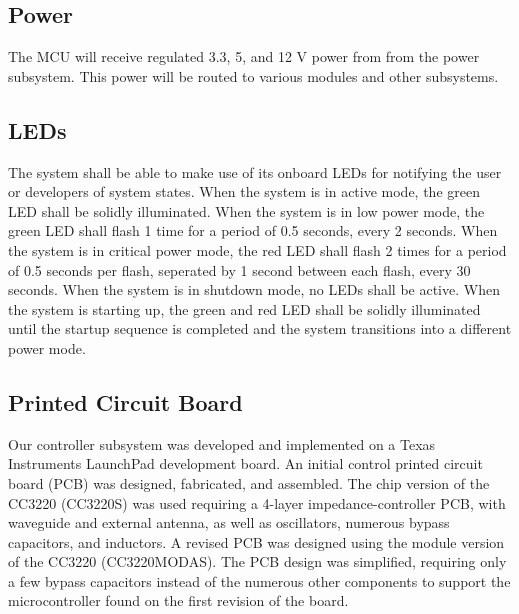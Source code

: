 \subsection{Power}
The MCU will receive regulated 3.3, 5, and 12 V power from from the power subsystem. This power will be routed to various modules and other subsystems.

\subsection{LEDs} The system shall be able to make use of its onboard LEDs for notifying the user or developers of system states. When the system is in active mode, the green LED shall be solidly illuminated. When the system is in low power mode, the green LED shall flash 1 time for a period of 0.5 seconds, every 2 seconds. When the system is in critical power mode, the red LED shall flash 2 times for a period of 0.5 seconds per flash, seperated by 1 second between each flash, every 30 seconds. When the system is in shutdown mode, no LEDs shall be active. When the system is starting up, the green and red LED shall be solidly illuminated until the startup sequence is completed and the system transitions into a different power mode.

\subsection{Printed Circuit Board} Our controller subsystem was developed and implemented on a Texas Instruments LaunchPad development board. An initial control printed circuit board (PCB) was designed, fabricated, and assembled. The chip version of the CC3220 (CC3220S) was used requiring a 4-layer impedance-controller PCB, with waveguide and external antenna, as well as oscillators, numerous bypass capacitors, and inductors. A revised PCB was designed using the module version of the CC3220 (CC3220MODAS). The PCB design was simplified, requiring only a few bypass capacitors instead of the numerous other components to support the microcontroller found on the first revision of the board.